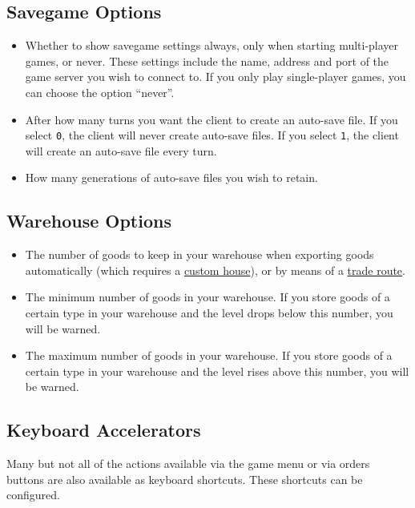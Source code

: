 \documentclass[12pt]{book}
\begin{document}
\hypertarget{savegame options}{\subsection{Savegame Options}}

\begin{itemize}
\item Whether to \hypertarget{show savegame settings}{show savegame
settings} always, only when starting multi-player games, or
never. These settings include the name, address and port of the game
server you wish to connect to. If you only play single-player games,
you can choose the option ``never''.
\item After how many turns you want the client to create an auto-save
  file. If you select \verb$0$, the client will never create auto-save
  files. If you select \verb$1$, the client will create an auto-save
  file every turn.
\item How many generations of auto-save files you wish to retain.
\end{itemize}

\hypertarget{warehouse options}{\subsection{Warehouse Options}}

\begin{itemize}
\item The number of goods to keep in your warehouse when exporting
  goods automatically (which requires a \hyperlink{Custom House}
  {custom house}), or by means of a \hyperlink{Trade Routes}{trade
    route}.
\item The minimum number of goods in your warehouse. If you store
  goods of a certain type in your warehouse and the level drops below
  this number, you will be warned.
\item The maximum number of goods in your warehouse. If you store
  goods of a certain type in your warehouse and the level rises above
  this number, you will be warned.
\end{itemize}


\hypertarget{keyboard accelerators}{\subsection{Keyboard
    Accelerators}}

Many but not all of the actions available via the game menu or via
orders buttons are also available as keyboard shortcuts. These
shortcuts can be configured.
\end{document}
